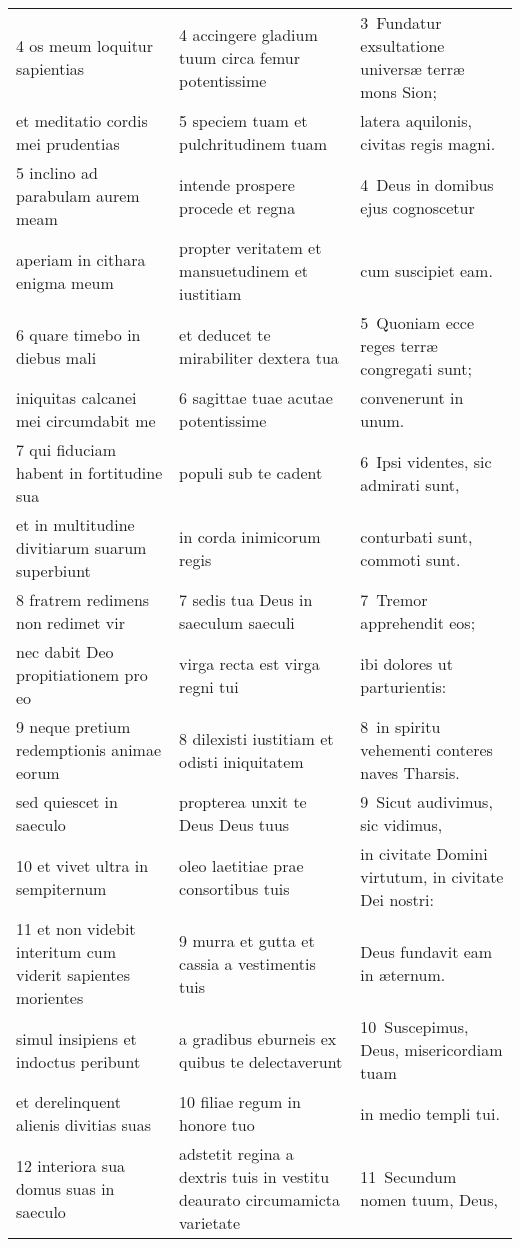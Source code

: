 \documentclass{article}
\begin{document}
\begin{longtable}{@{}p{}p{}p{}@{}}
4 os meum loquitur sapientias	&	4 accingere gladium tuum circa femur potentissime	&	3 Fundatur exsultatione universæ terræ mons Sion;	\\
et meditatio cordis mei prudentias	&	5 speciem tuam et pulchritudinem tuam	&	latera aquilonis, civitas regis magni.	\\
5 inclino ad parabulam aurem meam	&	intende prospere procede et regna	&	4 Deus in domibus ejus cognoscetur	\\
aperiam in cithara enigma meum	&	propter veritatem et mansuetudinem et iustitiam	&	cum suscipiet eam.	\\
6 quare timebo in diebus mali	&	et deducet te mirabiliter dextera tua	&	5 Quoniam ecce reges terræ congregati sunt;	\\
iniquitas calcanei mei circumdabit me	&	6 sagittae tuae acutae potentissime	&	convenerunt in unum.	\\
7 qui fiduciam habent in fortitudine sua	&	populi sub te cadent	&	6 Ipsi videntes, sic admirati sunt,	\\
et in multitudine divitiarum suarum superbiunt	&	in corda inimicorum regis	&	conturbati sunt, commoti sunt.	\\
8 fratrem redimens non redimet vir	&	7 sedis tua Deus in saeculum saeculi	&	7 Tremor apprehendit eos;	\\
nec dabit Deo propitiationem pro eo	&	virga recta est virga regni tui	&	ibi dolores ut parturientis:	\\
9 neque pretium redemptionis animae eorum	&	8 dilexisti iustitiam et odisti iniquitatem	&	8 in spiritu vehementi conteres naves Tharsis.	\\
sed quiescet in saeculo	&	propterea unxit te Deus Deus tuus	&	9 Sicut audivimus, sic vidimus,	\\
10 et vivet ultra in sempiternum	&	oleo laetitiae prae consortibus tuis	&	in civitate Domini virtutum, in civitate Dei nostri:	\\
11 et non videbit interitum cum viderit sapientes morientes	&	9 murra et gutta et cassia a vestimentis tuis	&	Deus fundavit eam in æternum.	\\
simul insipiens et indoctus peribunt	&	a gradibus eburneis ex quibus te delectaverunt	&	10 Suscepimus, Deus, misericordiam tuam	\\
et derelinquent alienis divitias suas	&	10 filiae regum in honore tuo	&	in medio templi tui.	\\
12 interiora sua domus suas in saeculo	&	adstetit regina a dextris tuis in vestitu deaurato circumamicta varietate	&	11 Secundum nomen tuum, Deus,	\\

\end{longtable}
\end{document}
